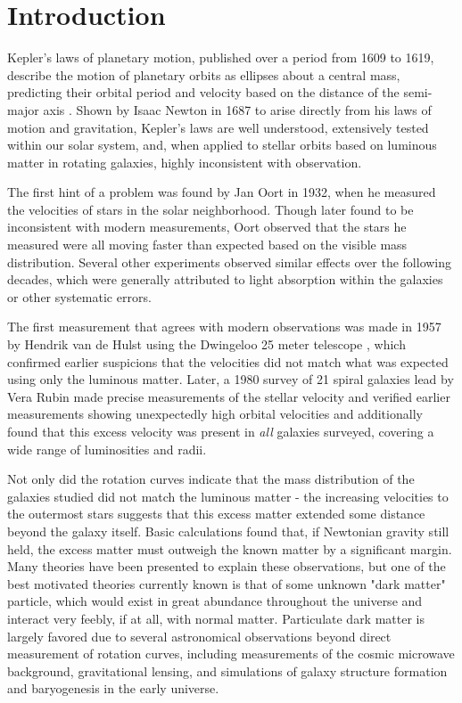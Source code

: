 \chapter{Introduction}
\label{intro_chapter}

Kepler's laws of planetary motion, published over a period from 1609 to 1619, describe the motion of planetary orbits as ellipses about a central mass, predicting their orbital period and velocity based on the distance of the semi-major axis \cite{kepler, russell}.
Shown by Isaac Newton in 1687 \cite{newton} to arise directly from his laws of motion and gravitation, Kepler's laws are well understood, extensively tested within our solar system, and, when applied to stellar orbits based on luminous matter in rotating galaxies, highly inconsistent with observation.

The first hint of a problem was found by Jan Oort in 1932, when he measured the velocities of stars in the solar neighborhood. 
Though later found to be inconsistent with modern measurements, Oort observed that the stars he measured were all moving faster than expected based on the visible mass distribution.
Several other experiments observed similar effects over the following decades, which were generally attributed to light absorption within the galaxies or other systematic errors.

The first measurement that agrees with modern observations was made in 1957 by Hendrik van de Hulst using the Dwingeloo 25 meter telescope \cite{deHulst}, which confirmed earlier suspicions that the velocities did not match what was expected using only the luminous matter.
Later, a 1980 survey of 21 spiral galaxies lead by Vera Rubin \cite{RubinSurvey} made precise measurements of the stellar velocity and verified earlier measurements showing unexpectedly high orbital velocities and additionally found that this excess velocity was present in \textit{all} galaxies surveyed, covering a wide range of luminosities and radii.

Not only did the rotation curves indicate that the mass distribution of the galaxies studied did not match the luminous matter - the increasing velocities to the outermost stars suggests that this excess matter extended some distance beyond the galaxy itself. 
Basic calculations found that, if Newtonian gravity still held, the excess matter must outweigh the known matter by a significant margin. 
Many theories have been presented to explain these observations, but one of the best motivated theories currently known is that of some unknown "dark matter" particle, which would exist in great abundance throughout the universe and interact very feebly, if at all, with normal matter.
Particulate dark matter is largely favored due to several astronomical observations beyond direct measurement of rotation curves, including measurements of the cosmic microwave background, gravitational lensing, and simulations of galaxy structure formation and baryogenesis in the early universe.

